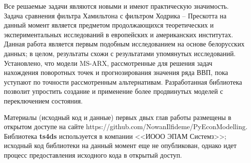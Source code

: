 \documentclass[a4paper,14pt]{extreport}
\begin{document}
{		Все решаемые задачи являются новыми и имеют практическую значимость. Задача сравнения фильтра Хамильтона с фильтром Ходрика -- Прескотта на данный момент является предметом продолжающихся теоретических и экспериментальных исследований в европейских и американских институтах. Данная работа является первым подобным исследованием на основе белорусских данных; в целом, результаты схожи с результатами упомянутых исследований. 
		Установлено, что модели MS-ARX, рассмотренные для решения задач нахождения поворотных точек и прогнозирования значения ряда ВВП, пока уступают по точности рассмотренным альтернативам. Разработанная библиотека позволит упростить создание и применение более продвинутых моделей с переключением состояния.
		
		Материалы (исходный код и данные) первых двых глав работы размещены в открытом доступе на сайте {https://github.com/NowanIlfideme/PyEconModelling}. Библиотека \textbf{ts4ds} используется в компании <<ИООО ЭПАМ Системз>>; исходный код библиотеки на данный момент еще не опубликован, однако идет процесс предоставления исходного кода в открытый доступ.
	}
	
	\chapter*{}
	\printbibliography[title=Список источников]
	
\end{document}
